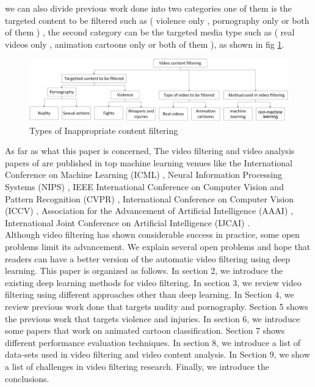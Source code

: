 \documentclass[runningheads]{llncs}
\begin{document}
we can also divide previous work done into two categories one of them is the targeted content to be filtered such as ( violence only , pornography only or both of them ) , the second category can be the targeted media type such as ( real videos only , animation cartoons only or both of them ), as shown in fig \ref{content_types}. \\
\begin{figure}
\centering
\includegraphics[width=\textwidth]{figures/types_v3.jpg}
\caption{Types of Inappropriate content filtering} \label{content_types}
\end{figure}

As far as what this paper is concerned, The video filtering and video analysis papers of are published in top machine learning venues like the International Conference on Machine Learning (ICML) \cite{srivastava2015unsupervised}, Neural Information Processing Systems (NIPS) \cite{simonyan2014two}, IEEE International Conference on Computer Vision and Pattern Recognition (CVPR) \cite{karpathy2014large}, International Conference on Computer Vision (ICCV) \cite{li2017leveraging}, Association for the Advancement of Artificial Intelligence (AAAI) \cite{sachan2013sports}, International Joint Conference on Artificial Intelligence (IJCAI) \cite{fan2018watching}. \\

Although video filtering has shown considerable success in practice, some open problems limit its advancement. We explain several open problems and hope that readers can have a better version of the automatic video filtering using deep learning. This paper is organized as follows. In section 2, we introduce the existing deep learning methods for video filtering. In section 3, we review video filtering using different approaches other than deep learning. In Section 4, we review previous work done that targets nudity and pornography. Section 5 shows the previous work that targets violence and injuries. In section 6, we introduce some papers that work on animated cartoon classification. Section 7 shows different performance evaluation techniques. In section 8, we introduce a list of data-sets used in video filtering and video content analysis. In Section 9, we show a list of challenges in video filtering research. Finally, we introduce the conclusions.\\
\end{document}
